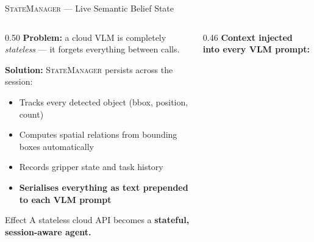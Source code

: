 \documentclass[aspectratio=169, 10pt]{beamer}
\begin{document}
\begin{frame}{\textsc{StateManager} --- Live Semantic Belief State}
  \begin{columns}[T]
    \begin{column}{0.50\textwidth}
      \textbf{Problem:} a cloud VLM is completely
      \emph{stateless} --- it forgets everything between calls.

      \vspace{0.35em}
      \textbf{Solution:} \textsc{StateManager} persists across the session:
      \begin{itemize}\small
        \item Tracks every detected object (bbox, position, count)
        \item Computes spatial relations from bounding boxes automatically
        \item Records gripper state and task history
        \item \textbf{Serialises everything as text prepended to each VLM prompt}
      \end{itemize}

      \vspace{0.3em}
      \begin{alertblock}{Effect}
        \small
        A stateless cloud API becomes a
        \textbf{stateful, session-aware agent.}
      \end{alertblock}
    \end{column}

    \begin{column}{0.46\textwidth}
      \textbf{Context injected into every VLM prompt:}
      \vspace{0.2em}



\end{column}
\end{columns}
\end{frame}
\end{document}
